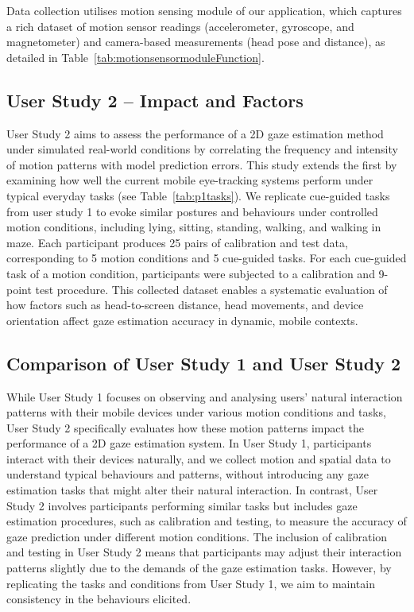 Data collection utilises motion sensing module of our application, which captures a rich dataset of motion sensor readings (accelerometer, gyroscope, and magnetometer) and camera-based measurements (head pose and distance), as detailed in Table~\ref{tab:motionsensormoduleFunction}.


\subsection{User Study 2 -- Impact and Factors}\label{subsec:impact_factor}
User Study 2 aims to assess the performance of a 2D gaze estimation method under simulated real-world conditions by correlating the frequency and intensity of motion patterns with model prediction errors. This study extends the first by examining how well the current mobile eye-tracking systems perform under typical everyday tasks (see Table~\ref{tab:p1tasks}). We replicate cue-guided tasks from user study 1 to evoke similar postures and behaviours under controlled motion conditions, including lying, sitting, standing, walking, and walking in maze. Each participant produces 25 pairs of calibration and test data, corresponding to 5 motion conditions and 5 cue-guided tasks. For each cue-guided task of a motion condition, participants were subjected to a calibration and 9-point test procedure. This collected dataset enables a systematic evaluation of how factors such as head-to-screen distance, head movements, and device orientation affect gaze estimation accuracy in dynamic, mobile contexts.

\subsection{Comparison of User Study 1 and User Study 2}
While User Study 1 focuses on observing and analysing users' natural interaction patterns with their mobile devices under various motion conditions and tasks, User Study 2 specifically evaluates how these motion patterns impact the performance of a 2D gaze estimation system. In User Study 1, participants interact with their devices naturally, and we collect motion and spatial data to understand typical behaviours and patterns, without introducing any gaze estimation tasks that might alter their natural interaction. In contrast, User Study 2 involves participants performing similar tasks but includes gaze estimation procedures, such as calibration and testing, to measure the accuracy of gaze prediction under different motion conditions. The inclusion of calibration and testing in User Study 2 means that participants may adjust their interaction patterns slightly due to the demands of the gaze estimation tasks. However, by replicating the tasks and conditions from User Study 1, we aim to maintain consistency in the behaviours elicited.

